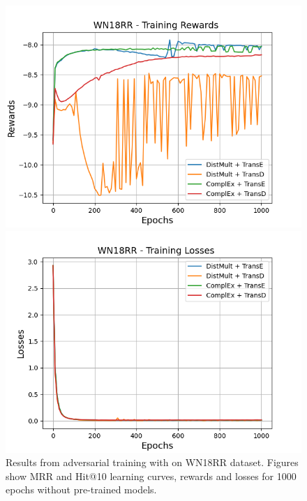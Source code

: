 \begin{figure}[H]
    \begin{minipage}{.45\textwidth}
      \centering
      \includegraphics[width=0.9\linewidth]{figures/results/gan_train/not_pretrained/uncertainty/max/entropy/wn18rr/1k_epochs/uncertainty_wn18rr_rew.png}
    \end{minipage}%
     \begin{minipage}{.45\textwidth}
      \centering
      \includegraphics[width=0.9\linewidth]{figures/results/gan_train/not_pretrained/uncertainty/max/entropy/wn18rr/1k_epochs/uncertainty_wn18rr_losses.png}
    \end{minipage}%
    \caption{Results from adversarial training with \usmax on \textsc{WN18RR} dataset.
    Figures show MRR and Hit@10 learning curves, rewards and losses for 1000 epochs without pre-trained models.}
    \label{fig:gan_train_not_pretrained_usmax_wn18rr}
\end{figure}
